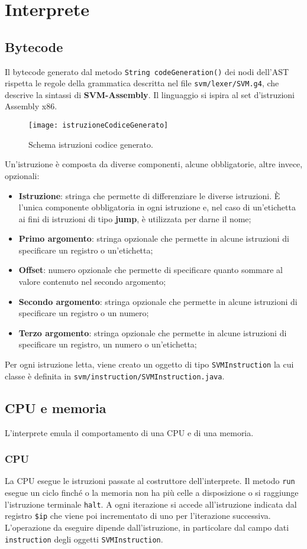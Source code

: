 \documentclass[../report.tex]{subfiles}
\begin{document}
\chapter{Interprete}\label{c:interprete}
\section{Bytecode}\label{s:bytecode}
Il bytecode generato dal metodo \verb|String codeGeneration()| dei nodi dell'AST rispetta le regole della grammatica descritta nel file \verb|svm/lexer/SVM.g4|, che descrive la sintassi di \textbf{SVM-Assembly}. Il linguaggio si ispira al set d'istruzioni Assembly x86. 
\begin{figure}[H]
    \centering
    \texttt{[image: istruzioneCodiceGenerato]}
    \caption{Schema istruzioni codice generato.}
    \label{fig:istruzione-codice-generato}
\end{figure}
\noindent
Un'istruzione è composta da diverse componenti, alcune obbligatorie, altre invece, opzionali:
\begin{itemize}
    \item \textbf{Istruzione}: stringa che permette di differenziare le diverse istruzioni. \`E l'unica componente obbligatoria in ogni istruzione e, nel caso di un'etichetta ai fini di istruzioni di tipo \textbf{jump}, è utilizzata per darne il nome;
    \item \textbf{Primo argomento}: stringa opzionale che permette in alcune istruzioni di specificare un registro o un'etichetta;
    \item \textbf{Offset}: numero opzionale che permette di specificare quanto sommare al valore contenuto nel secondo argomento;
    \item \textbf{Secondo argomento}: stringa opzionale che permette in alcune istruzioni di specificare un registro o un numero;
    \item \textbf{Terzo argomento}: stringa opzionale che permette in alcune istruzioni di specificare un registro, un numero o un'etichetta;
\end{itemize}
Per ogni istruzione letta, viene creato un oggetto di tipo \verb|SVMInstruction| la cui classe è definita in \verb|svm/instruction/SVMInstruction.java|.
\section{CPU e memoria}\label{s:cpu-e-memoria}
L'interprete emula il comportamento di una CPU e di una memoria.
\subsection{CPU}\label{ss:cpu}
La CPU esegue le istruzioni passate al costruttore dell'interprete. Il metodo \verb|run| esegue un ciclo finché o la memoria non ha più celle a disposizione o si raggiunge l'istruzione terminale \verb|halt|. A ogni iterazione si accede all'istruzione indicata dal registro \verb|$ip| che viene poi incrementato di uno per l'iterazione successiva. L'operazione da eseguire dipende dall'istruzione, in particolare dal campo dati \verb|instruction| degli oggetti \verb|SVMInstruction|.
\end{document}
